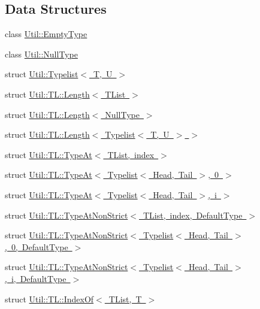 \subsection*{Data Structures}
\begin{DoxyCompactItemize}
\item 
class \mbox{\hyperlink{classUtil_1_1EmptyType}{Util\+::\+Empty\+Type}}
\item 
class \mbox{\hyperlink{classUtil_1_1NullType}{Util\+::\+Null\+Type}}
\item 
struct \mbox{\hyperlink{structUtil_1_1Typelist}{Util\+::\+Typelist$<$ T, U $>$}}
\item 
struct \mbox{\hyperlink{structUtil_1_1TL_1_1Length}{Util\+::\+T\+L\+::\+Length$<$ T\+List $>$}}
\item 
struct \mbox{\hyperlink{structUtil_1_1TL_1_1Length_3_01NullType_01_4}{Util\+::\+T\+L\+::\+Length$<$ Null\+Type $>$}}
\item 
struct \mbox{\hyperlink{structUtil_1_1TL_1_1Length_3_01Typelist_3_01T_00_01U_01_4_01_4}{Util\+::\+T\+L\+::\+Length$<$ Typelist$<$ T, U $>$ $>$}}
\item 
struct \mbox{\hyperlink{structUtil_1_1TL_1_1TypeAt}{Util\+::\+T\+L\+::\+Type\+At$<$ T\+List, index $>$}}
\item 
struct \mbox{\hyperlink{structUtil_1_1TL_1_1TypeAt_3_01Typelist_3_01Head_00_01Tail_01_4_00_010_01_4}{Util\+::\+T\+L\+::\+Type\+At$<$ Typelist$<$ Head, Tail $>$, 0 $>$}}
\item 
struct \mbox{\hyperlink{structUtil_1_1TL_1_1TypeAt_3_01Typelist_3_01Head_00_01Tail_01_4_00_01i_01_4}{Util\+::\+T\+L\+::\+Type\+At$<$ Typelist$<$ Head, Tail $>$, i $>$}}
\item 
struct \mbox{\hyperlink{structUtil_1_1TL_1_1TypeAtNonStrict}{Util\+::\+T\+L\+::\+Type\+At\+Non\+Strict$<$ T\+List, index, Default\+Type $>$}}
\item 
struct \mbox{\hyperlink{structUtil_1_1TL_1_1TypeAtNonStrict_3_01Typelist_3_01Head_00_01Tail_01_4_00_010_00_01DefaultType_01_4}{Util\+::\+T\+L\+::\+Type\+At\+Non\+Strict$<$ Typelist$<$ Head, Tail $>$, 0, Default\+Type $>$}}
\item 
struct \mbox{\hyperlink{structUtil_1_1TL_1_1TypeAtNonStrict_3_01Typelist_3_01Head_00_01Tail_01_4_00_01i_00_01DefaultType_01_4}{Util\+::\+T\+L\+::\+Type\+At\+Non\+Strict$<$ Typelist$<$ Head, Tail $>$, i, Default\+Type $>$}}
\item 
struct \mbox{\hyperlink{structUtil_1_1TL_1_1IndexOf}{Util\+::\+T\+L\+::\+Index\+Of$<$ T\+List, T $>$}}
\item 

\end{DoxyCompactItemize}
